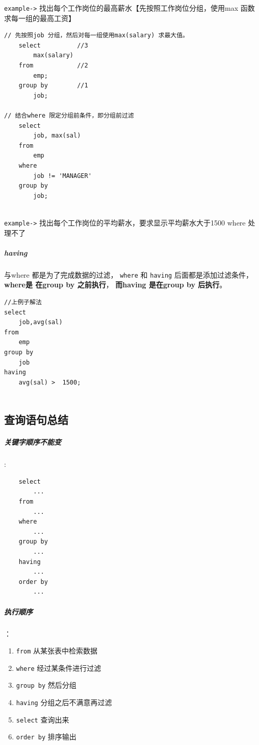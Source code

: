 \documentclass[UTF8,a4paper,12pt]{ctexbook}
\begin{document}
				\verb|example->| 找出每个工作岗位的最高薪水【先按照工作岗位分组，使用max 函数求每一组的最高工资】
				
					\begin{lstlisting}
// 先按照job 分组，然后对每一组使用max(salary) 求最大值。					
	select 			//3
		max(salary)
	from			//2
		emp;
	group by		//1
		job;	
		
// 结合where 限定分组前条件，即分组前过滤
	select
		job, max(sal)
	from 
		emp
	where 
		job != 'MANAGER'
	group by
		job;
	
					\end{lstlisting}
			
				\verb|example->| 找出每个工作岗位的平均薪水，要求显示平均薪水大于1500
				 where  处理不了
				
			\subparagraph{having} 与where 都是为了完成数据的过滤， \verb|where| 和 \verb|having| 后面都是添加过滤条件，\textbf{where是 在group by 之前执行}， \textbf{而having 是在group  by  后执行}。
			
				\begin{lstlisting}
//上例子解法
select 
	job,avg(sal)
from 
	emp
group by
	job
having 
	avg(sal) >  1500;
 
				\end{lstlisting}
			
			
			\subsection{查询语句总结}
			
				\subparagraph{关键字顺序不能变}:
				
					\begin{lstlisting}
	select 
		...
	from
		...
	where
		...
	group by
		...
	having
		...
	order by
		...
					\end{lstlisting}
			
				\subparagraph{执行顺序}：
					\begin{enumerate}[itemindent = 2em]
						\item \verb|from| 从某张表中检索数据
						\item \verb|where| 经过某条件进行过滤
						\item \verb|group by| 然后分组
						\item \verb|having| 分组之后不满意再过滤
						\item \verb|select| 查询出来
						\item \verb|order by| 排序输出
					\end{enumerate}
		
\end{document}
